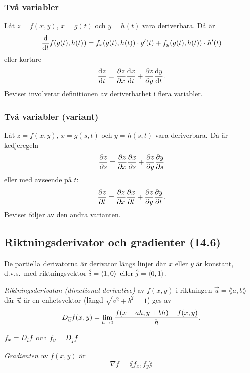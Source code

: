 \documentclass[a4paper]{article}
\begin{document}
\subsubsection{Två variabler}
Låt \(
    z = f(x,y)
\), \(
    x = g(t)
\) och \(
    y = h(t)
\) vara deriverbara. Då är \[
    \dv{t} f(g(t), h(t)) = f_x(g(t), h(t)) \cdot g'(t) + f_y(g(t), h(t)) \cdot h'(t)
\] eller kortare 
\[
    \dv{z}{t} = \pdv{z}{x}\dv{x}{t} + \pdv{z}{y} \dv{y}{t}.
\] Beviset involverar definitionen av deriverbarhet i flera variabler.


\subsubsection{Två variabler (variant)}
Låt \(
    z = f(x,y)
\), \(
    x = g(s, t)
\) och \(
    y = h(s,t)
\) vara deriverbara. Då är kedjeregeln \[
    \pdv{z}{s} = \pdv{z}{x}\pdv{x}{s} + \pdv{z}{y}\pdv{y}{s}
\] eller med avseende på \(
    t
\): \[
    \pdv{z}{t} = \pdv{z}{x}\pdv{x}{t} + \pdv{z}{y}\pdv{y}{t}.
\] 
Beviset följer av den andra varianten.

\subsection{Riktningsderivator och gradienter (14.6)}
De partiella derivatorna är derivator längs linjer där \(
    x
\) eller \(
    y
\) är konstant, d.v.s.\ med riktningsvektor \(
    \hat{i} = \left\langle 1, 0 \right\rangle \text{ eller } \hat{j} = \left\langle 0,1 \right\rangle
\).

\begin{defn}[Riktningsderivata]
    \emph{Riktningsderivatan (directional derivative)} av \(
        f(x,y)
    \) i riktningen \(
        \vec{u} = \lang a, b \rang
    \) där \(
        \accentset{\rightharpoonup}{u} 
    \) är en enhetsvektor (längd \(
        \sqrt{a^2+b^2} = 1
    \)) ges av \[
        D_{\accentset{\rightharpoonup}{u} } f(x,y) = \displaystyle\lim_{h \to 0} \displaystyle\frac{f(x+ah, y+bh)-f(x,y)}{h}.
    \]
\end{defn}

\begin{anm}
    \(
        f_x = D_{\hat{i}} f
    \) och \(
        f_y = D_{\hat{j}} f
    \) 
\end{anm}

\begin{defn}[Gradient]
    \emph{Gradienten} av \(
        f(x,y)
    \) är \[
        \nabla f = \lang f_x, f_y\rang
    \] 
\end{defn}
\end{document}
